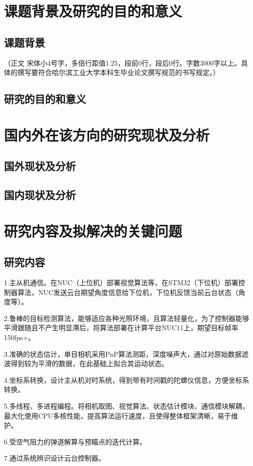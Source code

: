 \section{课题背景及研究的目的和意义}
\subsection{课题背景}
（正文  宋体小4号字，多倍行距值1.25，段前0行，段后0行。字数3000字以上。具体的撰写要符合哈尔滨工业大学本科生毕业论文撰写规范的书写规定。）\cite{hithesis2017}
\subsection{研究的目的和意义}
\section{国内外在该方向的研究现状及分析}
\subsection{国外现状及分析}
\subsection{国内现状及分析}
\section{研究内容及拟解决的关键问题}
\subsection{研究内容}
1.主从机通信。在NUC（上位机）部署视觉算法等，在STM32（下位机）部署控制器算法，NUC发送云台期望角度信息给下位机，下位机反馈当前云台状态（角度等）。\par
2.鲁棒的目标检测算法，能够适应各种光照环境，且算法轻量化，为了控制器能够平滑跟随且不产生明显滞后，将算法部署在计算平台NUC11上，期望目标帧率150fps+。 \par
3.准确的状态估计，单目相机采用PnP算法测距，深度噪声大，通过对原始数据滤波得到较为平滑的数据，在此基础上拟合其运动状态。 \par
4.坐标系转换，设计主从机对时系统，得到带有时间戳的陀螺仪信息，方便坐标系转换。 \par
5.多线程、多进程编程。将相机取图、视觉算法、状态估计模块、通信模块解耦，最大化使用CPU多核性能，提高算法运行速度，且使得整体框架清晰，易于维护。\par
6.受空气阻力的弹道解算与预瞄点的迭代计算。\par
7.通过系统辨识设计云台控制器。\par
